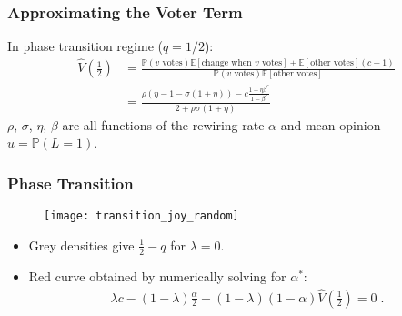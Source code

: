 \documentclass{beamer}
\newcommand\E[0]{\mathbb{E}}
\newcommand\prob[0]{\mathbb{P}}
\begin{document}
		
		\begin{frame}\frametitle{Approximating the Voter Term}
			In phase transition regime ($q = 1/2$): 
			\begin{align*}
				\hat{V}\left(\frac{1}{2}\right) &=  \frac{\mathbb{P}(v \text{ votes})\E[\text{change when } v \text{ votes}] + \E[\text{other votes}](c-1)}{\mathbb{P}(v \text{ votes})\E[\text{other votes}]} \\ 
				&= \frac{\rho(\eta - 1 - \sigma(1+\eta)) - c\frac{1 - \eta \beta^c}{1-\beta^c}}{2+\rho\sigma(1+\eta)}
			\end{align*}
			$\rho$, $\sigma$, $\eta$, $\beta$ are all functions of the rewiring rate $\alpha$ and mean opinion $u = \prob(L = 1)$. 
		\end{frame}
	
		
		\begin{frame}\frametitle{Phase Transition}
		  	\begin{figure}
		  		\centering
		  		\texttt{[image: transition\_joy\_random]}
		  	\end{figure}
		  	\begin{itemize}
		  		\item Grey densities give $\frac{1}{2} - q$\; for $\lambda = 0$.
		  		\item Red curve obtained by numerically solving for $\alpha^*$:
		  		\begin{align*}
		  		 \lambda c -(1-\lambda)\frac{\alpha}{2} + (1-\lambda)(1-\alpha)\hat{V}\left(\frac{1}{2}\right) = 0\;.
		  	\end{align*}
		  	\end{itemize}
		\end{frame}
	
		
\end{document}
